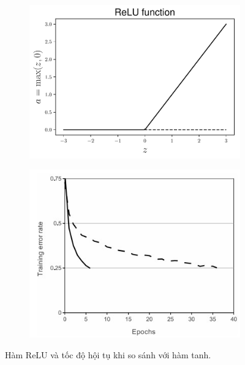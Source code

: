 \begin{figure}[t]
    \begin{subfigure}{0.49\textwidth}
    \includegraphics[width=0.99\linewidth]{ebookML_src/src/mlp/relu.pdf}
    \caption{}
    \label{fig:14_6a}
    \end{subfigure}
    \begin{subfigure}{0.49\textwidth}
    \includegraphics[width=0.99\linewidth]{Chapters/05_NeuralNetworks/14_mlp/alexplot.jpeg}
    \caption{}
    \label{fig:14_6b}
    \end{subfigure}
    \caption{
     Hàm ReLU và tốc độ hội tụ khi so sánh với hàm tanh.
    }
    \label{fig:14_6}
\end{figure}


